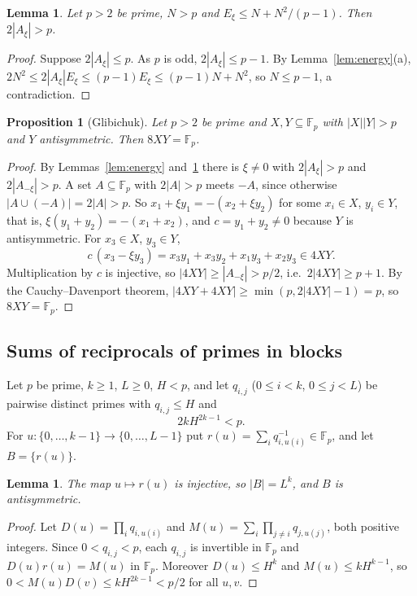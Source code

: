 \documentclass[11pt]{amsart}
\theoremstyle{plain}
\newtheorem{lemma}[theorem]{Lemma}
\newtheorem{proposition}[theorem]{Proposition}
\theoremstyle{definition}
\newcommand{\F}{\mathbb{F}_p}
\begin{document}
{\begin{lemma}\label{lem:half}
Let $p>2$ be prime, $N>p$ and $E_\xi\le N+N^2/(p-1)$. Then $2|A_\xi|>p$.
\end{lemma}

\begin{proof}
Suppose $2|A_\xi|\le p$. As $p$ is odd, $2|A_\xi|\le p-1$. By Lemma~\ref{lem:energy}(a), $2N^2\le2|A_\xi|E_\xi\le(p-1)E_\xi\le(p-1)N+N^2$, so $N\le p-1$, a contradiction.
\end{proof}

\begin{proposition}[Glibichuk]\label{prop:cover}
Let $p>2$ be prime and $X,Y\subseteq\F$ with $|X||Y|>p$ and $Y$ antisymmetric. Then $8XY=\F$.
\end{proposition}

\begin{proof}
By Lemmas~\ref{lem:energy} and~\ref{lem:half} there is $\xi\ne0$ with $2|A_\xi|>p$ and $2|A_{-\xi}|>p$.
A set $A\subseteq\F$ with $2|A|>p$ meets $-A$, since otherwise $|A\cup(-A)|=2|A|>p$.
So $x_1+\xi y_1=-(x_2+\xi y_2)$ for some $x_i\in X$, $y_i\in Y$, that is, $\xi(y_1+y_2)=-(x_1+x_2)$, and $c=y_1+y_2\ne0$ because $Y$ is antisymmetric.
For $x_3\in X$, $y_3\in Y$,
\[
  c\,(x_3-\xi y_3)=x_3y_1+x_3y_2+x_1y_3+x_2y_3\in 4XY.
\]
Multiplication by $c$ is injective, so $|4XY|\ge|A_{-\xi}|>p/2$, i.e.\ $2|4XY|\ge p+1$.
By the Cauchy--Davenport theorem, $|4XY+4XY|\ge\min(p,2|4XY|-1)=p$, so $8XY=\F$.
\end{proof}

\subsection{Sums of reciprocals of primes in blocks}\label{sec:blocks}
Let $p$ be prime, $k\ge1$, $L\ge0$, $H<p$, and let $q_{i,j}$ ($0\le i<k$, $0\le j<L$) be pairwise distinct primes with $q_{i,j}\le H$ and
\begin{equation}\label{eq:clear}
  2kH^{2k-1}<p.
\end{equation}
For $u\colon\{0,\dots,k-1\}\to\{0,\dots,L-1\}$ put $r(u)=\sum_iq_{i,u(i)}^{-1}\in\F$, and let $B=\{r(u)\}$.

\begin{lemma}\label{lem:blocks}
The map $u\mapsto r(u)$ is injective, so $|B|=L^k$, and $B$ is antisymmetric.
\end{lemma}

\begin{proof}
Let $D(u)=\prod_iq_{i,u(i)}$ and $M(u)=\sum_i\prod_{j\ne i}q_{j,u(j)}$, both positive integers. Since $0<q_{i,j}<p$, each $q_{i,j}$ is invertible in $\F$ and $D(u)r(u)=M(u)$ in $\F$. Moreover $D(u)\le H^k$ and $M(u)\le kH^{k-1}$, so $0<M(u)D(v)\le kH^{2k-1}<p/2$ for all $u,v$.


\end{proof}}
\end{document}
